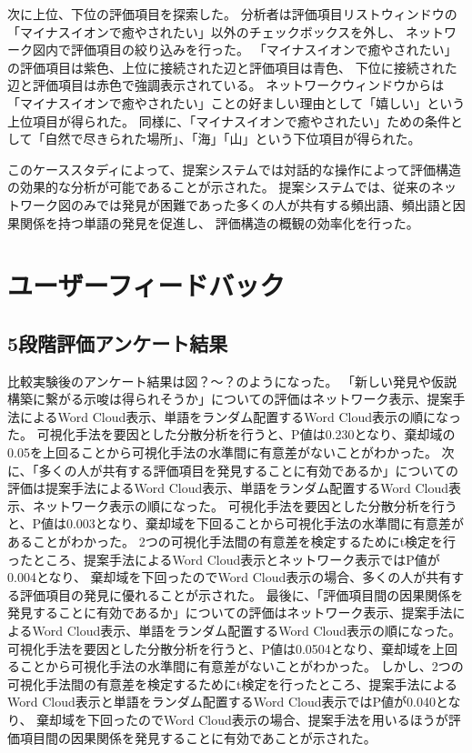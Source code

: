 \documentclass[syuuron]{kuee}
\begin{document}
	次に上位、下位の評価項目を探索した。
	分析者は評価項目リストウィンドウの「マイナスイオンで癒やされたい」以外のチェックボックスを外し、
	ネットワーク図内で評価項目の絞り込みを行った。
	「マイナスイオンで癒やされたい」の評価項目は紫色、上位に接続された辺と評価項目は青色、
	下位に接続された辺と評価項目は赤色で強調表示されている。
	ネットワークウィンドウからは「マイナスイオンで癒やされたい」ことの好ましい理由として「嬉しい」という上位項目が得られた。
	同様に、「マイナスイオンで癒やされたい」ための条件として「自然で尽きられた場所」、「海」「山」という下位項目が得られた。
	
	このケーススタディによって、提案システムでは対話的な操作によって評価構造の効果的な分析が可能であることが示された。
	提案システムでは、従来のネットワーク図のみでは発見が困難であった多くの人が共有する頻出語、頻出語と因果関係を持つ単語の発見を促進し、
	評価構造の概観の効率化を行った。
	
	\section{ユーザーフィードバック}
		\subsection{5段階評価アンケート結果}
		比較実験後のアンケート結果は図？～？のようになった。
		「新しい発見や仮説構築に繋がる示唆は得られそうか」についての評価はネットワーク表示、提案手法によるWord Cloud表示、単語をランダム配置するWord Cloud表示の順になった。
		可視化手法を要因とした分散分析を行うと、P値は0.230となり、棄却域の0.05を上回ることから可視化手法の水準間に有意差がないことがわかった。
		次に、「多くの人が共有する評価項目を発見することに有効であるか」についての評価は提案手法によるWord Cloud表示、単語をランダム配置するWord Cloud表示、ネットワーク表示の順になった。
		可視化手法を要因とした分散分析を行うと、P値は0.003となり、棄却域を下回ることから可視化手法の水準間に有意差があることがわかった。
		2つの可視化手法間の有意差を検定するためにt検定を行ったところ、提案手法によるWord Cloud表示とネットワーク表示ではP値が0.004となり、
		棄却域を下回ったのでWord Cloud表示の場合、多くの人が共有する評価項目の発見に優れることが示された。
		最後に、「評価項目間の因果関係を発見することに有効であるか」についての評価はネットワーク表示、提案手法によるWord Cloud表示、単語をランダム配置するWord Cloud表示の順になった。
		可視化手法を要因とした分散分析を行うと、P値は0.0504となり、棄却域を上回ることから可視化手法の水準間に有意差がないことがわかった。
		しかし、2つの可視化手法間の有意差を検定するためにt検定を行ったところ、提案手法によるWord Cloud表示と単語をランダム配置するWord Cloud表示ではP値が0.040となり、
		棄却域を下回ったのでWord Cloud表示の場合、提案手法を用いるほうが評価項目間の因果関係を発見することに有効であことが示された。
	
\end{document}
